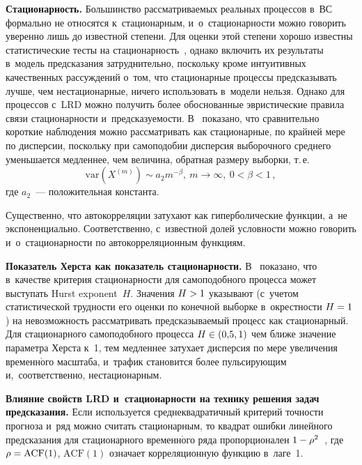 \begin{multicols}{2}
  \textbf{Стационарность.} Большинство рас\-смат\-ри\-ва\-емых реальных 
процессов в~ВС формально не относятся к~стационарным, 
и~о~стационарности мож\-но говорить уверенно лишь до известной степени. 
Для оценки этой степени хорошо известны статистические тесты на 
стационарность~\cite{17-fr}, однако включить их результаты в~модель 
предсказания затруднительно, поскольку кроме интуитивных качественных 
рассуждений о~том, что стационарные процессы предсказывать лучше, чем 
нестационарные, ничего использовать в~модели нельзя. Однако для 
процессов с~LRD можно получить более обоснованные эвристические 
правила связи стационарности и~предсказуемости. В~\cite{15-fr} показано, 
что сравнительно короткие наблюдения можно рассматривать как 
стационарные, по крайней мере по дисперсии, поскольку при самоподобии 
дисперсия выборочного среднего уменьшается медленнее, чем величина, 
обратная размеру выборки, т.\,е.\
$$
\mathrm{var}\left(X^{(m)}\right) \sim a_2m^{-\beta},\ m \to \infty,\ 0<\beta < 1\,,
$$ 
где $a_2$~--- положительная константа.
  
  Существенно, что автокорреляции затухают как гиперболические 
функции, а~не экспоненциально. Соответственно, с~известной долей 
условности можно говорить и~о~стационарности по автокорреляционным 
функциям. 

\smallskip
  
  \textbf{Показатель Херста {} как показатель стационарности.} В~\cite{18-fr} показано, что в~качестве критерия 
  ста\-ци\-о\-нар\-ности для са\-мо\-по\-доб\-но\-го процесса может 
выступать Hurst exponent~$H$. Значения $H\hm>1$ указывают (с~учетом 
ста\-ти\-сти\-че\-ской труд\-ности его оцен\-ки по конечной выборке в~окрест\-ности 
$H\hm=1$) на невозможность рас\-смат\-ри\-вать пред\-ска\-зы\-ва\-емый процесс как 
стационарный. Для стационарного самоподобного процесса $H\hm\in (0{,}5, 
1)$ чем ближе значение па\-ра\-мет\-ра Херста к~1, тем медленнее затухает 
дисперсия по мере увеличения временн$\acute{\mbox{о}}$го мас\-шта\-ба, и~трафик становится 
более пуль\-си\-ру\-ющим и,~соответственно, нестационарным. 

\smallskip
  
  \textbf{Влияние свойств LRD и~стационарности на технику решения 
задач предсказания.} Если используется среднеквадратичный критерий 
точности прогноза и~ряд можно считать стационарным, то квадрат ошибки 
линейного предсказания для стационарного временн$\acute{\mbox{о}}$го ряда 
пропорционален $1\hm-\rho^2$~\cite{8-fr}, где 
$\rho\hm=\mathrm{ACF}(1)$, $\mathrm{ACF}(1)$ означает 
корреляционную функцию в~лаге~1. 
  

\end{multicols}
